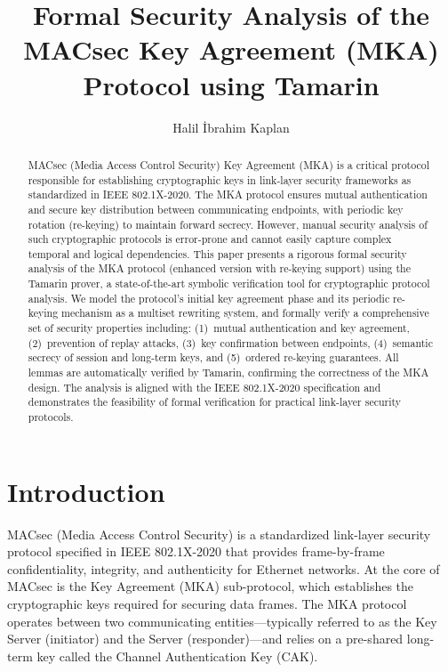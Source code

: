 \documentclass{llncs}
\begin{document}
\title{Formal Security Analysis of the MACsec Key Agreement (MKA) Protocol using Tamarin}
\author{Halil İbrahim Kaplan}
\maketitle

\begin{abstract}
MACsec (Media Access Control Security) Key Agreement (MKA) is a critical protocol responsible for establishing cryptographic keys in link-layer security frameworks as standardized in IEEE 802.1X-2020. The MKA protocol ensures mutual authentication and secure key distribution between communicating endpoints, with periodic key rotation (re-keying) to maintain forward secrecy. However, manual security analysis of such cryptographic protocols is error-prone and cannot easily capture complex temporal and logical dependencies. This paper presents a rigorous formal security analysis of the MKA protocol (enhanced version with re-keying support) using the Tamarin prover, a state-of-the-art symbolic verification tool for cryptographic protocol analysis. We model the protocol's initial key agreement phase and its periodic re-keying mechanism as a multiset rewriting system, and formally verify a comprehensive set of security properties including: (1)~mutual authentication and key agreement, (2)~prevention of replay attacks, (3)~key confirmation between endpoints, (4)~semantic secrecy of session and long-term keys, and (5)~ordered re-keying guarantees. All lemmas are automatically verified by Tamarin, confirming the correctness of the MKA design. The analysis is aligned with the IEEE 802.1X-2020 specification and demonstrates the feasibility of formal verification for practical link-layer security protocols.
\end{abstract}

\section{Introduction}
MACsec (Media Access Control Security) is a standardized link-layer security protocol specified in IEEE 802.1X-2020 that provides frame-by-frame confidentiality, integrity, and authenticity for Ethernet networks. At the core of MACsec is the Key Agreement (MKA) sub-protocol, which establishes the cryptographic keys required for securing data frames. The MKA protocol operates between two communicating entities---typically referred to as the Key Server (initiator) and the Server (responder)---and relies on a pre-shared long-term key called the Channel Authentication Key (CAK).
\end{document}
